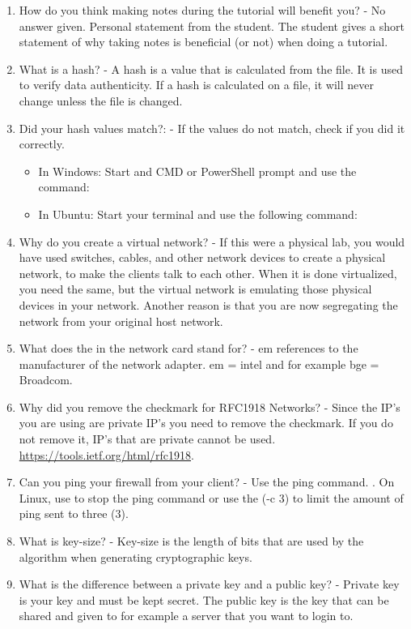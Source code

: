 \begin{enumerate}
    \item How do you think making notes during the tutorial will benefit you? - No answer given. Personal statement from the student. The student gives a short statement of why taking notes is beneficial (or not) when doing a tutorial.
    \item What is a hash? - A hash is a value that is calculated from the file. It is used to verify data authenticity. If a hash is calculated on a file, it will never change unless the file is changed.
    \item Did your hash values match?: - If the values do not match, check if you did it correctly.
    \begin{itemize}
        \item In Windows: Start and CMD or PowerShell prompt and use the command: 
        \item In Ubuntu: Start your terminal and use the following command: 
    \end{itemize}
    \item Why do you create a virtual network? - If this were a physical lab, you would have used switches, cables, and other network devices to create a physical network, to make the clients talk to each other. When it is done virtualized, you need the same, but the virtual network is emulating those physical devices in your network. Another reason is that you are now segregating the network from your original host network.
    \item What does the  in the network card stand for? - em references to the manufacturer of the network adapter. em = intel and for example bge = Broadcom.
    \item Why did you remove the checkmark for RFC1918 Networks? - Since the IP's you are using are private IP's you need to remove the checkmark. If you do not remove it, IP's that are private cannot be used. \url{https://tools.ietf.org/html/rfc1918}.
    \item Can you ping your firewall from your client? - Use the ping command. . On Linux, use  to stop the ping command or use the \cmd(-c 3) to limit the amount of ping sent to three (3).
    \item What is key-size? - Key-size is the length of bits that are used by the algorithm when generating cryptographic keys.
    \item What is the difference between a private key and a public key? - Private key is your key and must be kept secret. The public key is the key that can be shared and given to for example a server that you want to login to.

\end{enumerate}

